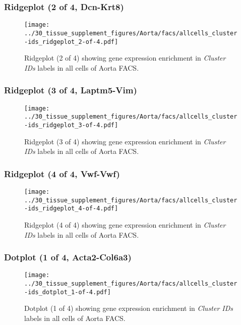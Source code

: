 \clearpage

\subsubsection{Ridgeplot (2 of 4, Dcn-Krt8)}
\begin{figure}[h]
\centering
\texttt{[image: ../30\_tissue\_supplement\_figures/Aorta/facs/allcells\_cluster-ids\_ridgeplot\_2-of-4.pdf]}

\caption{ Ridgeplot (2 of 4)  showing gene expression enrichment in \emph{Cluster IDs} labels in all cells of Aorta FACS. }
\end{figure}


\clearpage

\subsubsection{Ridgeplot (3 of 4, Laptm5-Vim)}
\begin{figure}[h]
\centering
\texttt{[image: ../30\_tissue\_supplement\_figures/Aorta/facs/allcells\_cluster-ids\_ridgeplot\_3-of-4.pdf]}

\caption{ Ridgeplot (3 of 4)  showing gene expression enrichment in \emph{Cluster IDs} labels in all cells of Aorta FACS. }
\end{figure}


\clearpage

\subsubsection{Ridgeplot (4 of 4, Vwf-Vwf)}
\begin{figure}[h]
\centering
\texttt{[image: ../30\_tissue\_supplement\_figures/Aorta/facs/allcells\_cluster-ids\_ridgeplot\_4-of-4.pdf]}

\caption{ Ridgeplot (4 of 4)  showing gene expression enrichment in \emph{Cluster IDs} labels in all cells of Aorta FACS. }
\end{figure}


\clearpage

\subsubsection{Dotplot (1 of 4, Acta2-Col6a3)}
\begin{figure}[h]
\centering
\texttt{[image: ../30\_tissue\_supplement\_figures/Aorta/facs/allcells\_cluster-ids\_dotplot\_1-of-4.pdf]}

\caption{ Dotplot (1 of 4)  showing gene expression enrichment in \emph{Cluster IDs} labels in all cells of Aorta FACS. }
\end{figure}


